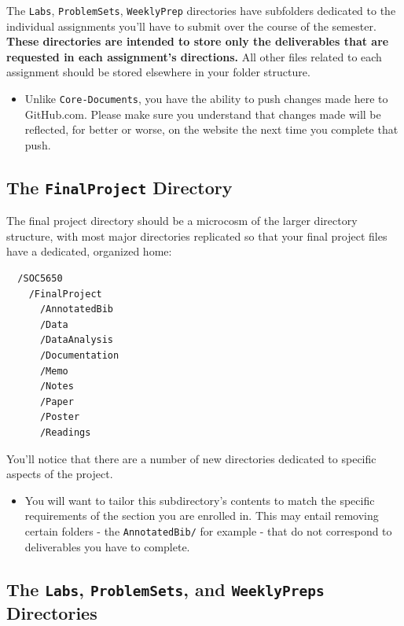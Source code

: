 \documentclass[]{book}
\newenvironment{rmdblock}[1]
  {\begin{shaded*}
  \begin{itemize}
  \renewcommand{\labelitemi}{
    \raisebox{-.7\height}[0pt][0pt]{
      {\setkeys{Gin}{width=3em,keepaspectratio}\texttt{[image: images/\#1]}}
    }
  }
  \item
  }
  {
  \end{itemize}
  \end{shaded*}
  }
\newenvironment{rmdnote}
  {\begin{rmdblock}{note}}
  {\end{rmdblock}}
\newenvironment{rmdwarning}
  {\begin{rmdblock}{warning}}
  {\end{rmdblock}}
\theoremstyle{definition}
\theoremstyle{definition}
\theoremstyle{definition}
\theoremstyle{remark}
\begin{document}
The \texttt{Labs}, \texttt{ProblemSets}, \texttt{WeeklyPrep} directories
have subfolders dedicated to the individual assignments you'll have to
submit over the course of the semester. \textbf{These directories are
intended to store only the deliverables that are requested in each
assignment's directions.} All other files related to each assignment
should be stored elsewhere in your folder structure.

\begin{rmdwarning}
Unlike \texttt{Core-Documents}, you have the ability to push changes
made here to GitHub.com. Please make sure you understand that changes
made will be reflected, for better or worse, on the website the next
time you complete that push.
\end{rmdwarning}

\subsection{\texorpdfstring{The \texttt{FinalProject}
Directory}{The FinalProject Directory}}\label{the-finalproject-directory}

The final project directory should be a microcosm of the larger
directory structure, with most major directories replicated so that your
final project files have a dedicated, organized home:

\begin{verbatim}
  /SOC5650
    /FinalProject
      /AnnotatedBib
      /Data
      /DataAnalysis
      /Documentation
      /Memo
      /Notes
      /Paper
      /Poster
      /Readings
\end{verbatim}

You'll notice that there are a number of new directories dedicated to
specific aspects of the project.

\begin{rmdnote}
You will want to tailor this subdirectory's contents to match the
specific requirements of the section you are enrolled in. This may
entail removing certain folders - the \texttt{AnnotatedBib/} for example
- that do not correspond to deliverables you have to complete.
\end{rmdnote}

\subsection{\texorpdfstring{The \texttt{Labs}, \texttt{ProblemSets}, and
\texttt{WeeklyPreps}
Directories}{The Labs, ProblemSets, and WeeklyPreps Directories}}\label{the-labs-problemsets-and-weeklypreps-directories}
\end{document}
